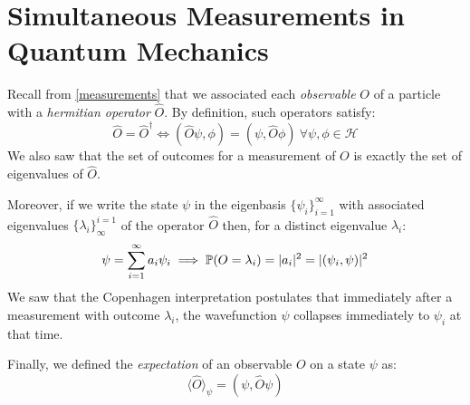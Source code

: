 \documentclass[../main.tex]{subfiles}
\begin{document}
\chapter{Simultaneous Measurements in Quantum Mechanics}
\begin{remark}[Recap]
  Recall from \cref{measurements} that we associated each \textit{observable} $O$ of a particle with a \textit{hermitian operator} $\hat{O}$.
  By definition, such operators satisfy:
  \[
    \hat{O} = \hat{O}^{\dag} \iff (\hat{O} \psi, \phi) = (\psi, \hat{O} \phi)\ \forall \psi, \phi \in \mathcal{H}
  \]
  We also saw that the set of outcomes for a measurement of $O$ is exactly the set of eigenvalues of $\hat{O}$.

  Moreover, if we write the state $\psi$ in the eigenbasis $\{\psi_i\}_{i = 1}^{\infty}$ with associated eigenvalues $\{\lambda_i\}^{i = 1}_{\infty}$ of the operator $\hat{O}$ then, for a distinct eigenvalue $\lambda_i$:
  \[
    \psi = \sum_{i = 1}^{\infty} a_i \psi_i \implies \P(O = \lambda_i) = |a_i|^2 = |(\psi_i, \psi)|^2
  \]
  We saw that the Copenhagen interpretation postulates that immediately after a measurement with outcome $\lambda_i$, the wavefunction $\psi$ collapses immediately to $\psi_i$ at that time.

  Finally, we defined the \textit{expectation} of an observable $O$ on a state $\psi$ as:
  \[
    \langle \hat{O} \rangle_{\psi} = (\psi, \hat{O} \psi)
  \]
\end{remark}
\end{document}
